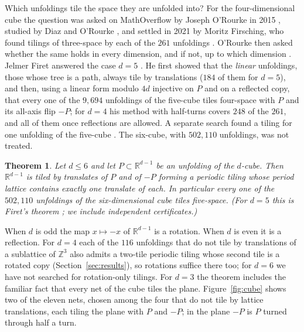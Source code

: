 \documentclass[11pt]{amsart}
\newtheorem{theorem}{Theorem}
\theoremstyle{definition}
\theoremstyle{remark}
\newcommand{\Z}{\mathbb{Z}}
\newcommand{\R}{\mathbb{R}}
\begin{document}
Which unfoldings tile the space they are unfolded into? For the four-dimensional cube the question was asked on MathOverflow by Joseph O'Rourke in 2015 \cite{MO199097}, studied by Diaz and O'Rourke \cite{DO}, and settled in 2021 by Moritz Firsching, who found tilings of three-space by each of the $261$ unfoldings \cite{Firsching}. O'Rourke then asked whether the same holds in every dimension, and if not, up to which dimension \cite{MO392890}. Jelmer Firet answered the case $d=5$ \cite{Firet}. He first showed that the \emph{linear} unfoldings, those whose tree is a path, always tile by translations ($184$ of them for $d=5$), and then, using a linear form modulo $4d$ injective on $P$ and on a reflected copy, that every one of the $9{,}694$ unfoldings of the five-cube tiles four-space with $P$ and its all-axis flip $-P$; for $d=4$ his method with half-turns covers $248$ of the $261$, and all of them once reflections are allowed. A separate search found a tiling for one unfolding of the five-cube \cite{Tsi4D}. The six-cube, with $502{,}110$ unfoldings, was not treated.

\begin{theorem}\label{thm:main}
Let $d\le 6$ and let $P\subset\R^{d-1}$ be an unfolding of the $d$-cube. Then $\R^{d-1}$ is tiled by translates of $P$ and of $-P$ forming a periodic tiling whose period lattice contains exactly one translate of each. In particular every one of the $502{,}110$ unfoldings of the six-dimensional cube tiles five-space. (For $d=5$ this is Firet's theorem \cite{Firet}; we include independent certificates.)
\end{theorem}

When $d$ is odd the map $x\mapsto -x$ of $\R^{d-1}$ is a rotation. When $d$ is even it is a reflection. For $d=4$ each of the $116$ unfoldings that do not tile by translations of a sublattice of $\Z^3$ also admits a two-tile periodic tiling whose second tile is a rotated copy (Section~\ref{sec:results}), so rotations suffice there too; for $d=6$ we have not searched for rotation-only tilings. For $d=3$ the theorem includes the familiar fact that every net of the cube tiles the plane. Figure~\ref{fig:cube} shows two of the eleven nets, chosen among the four that do not tile by lattice translations, each tiling the plane with $P$ and $-P$; in the plane $-P$ is $P$ turned through half a turn.
\end{document}

